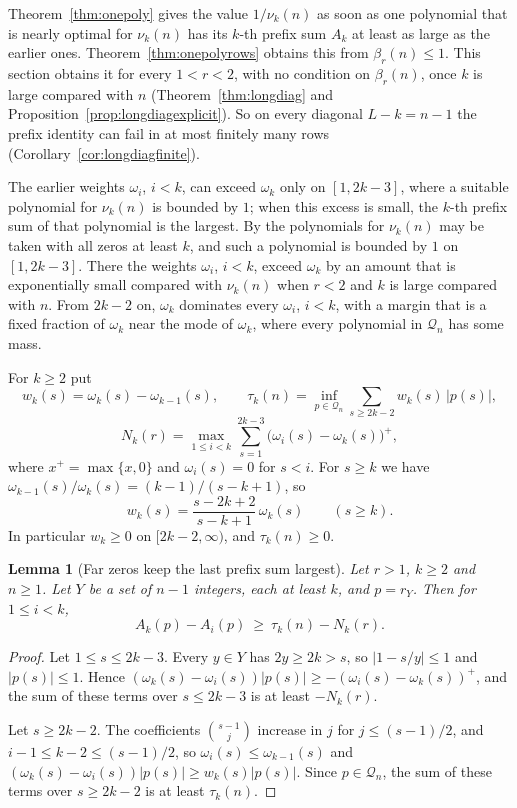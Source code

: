 \documentclass[11pt]{article}
\newtheorem{lemma}[theorem]{Lemma}
\begin{document}
Theorem~\ref{thm:onepoly} gives the value $1/\nu_k(n)$ as soon
as one polynomial that is nearly optimal for $\nu_k(n)$ has its $k$-th
prefix sum $A_k$ at least as large as the earlier ones.
Theorem~\ref{thm:onepolyrows} obtains this from $\beta_r(n)\le1$.  This
section obtains it for every $1<r<2$, with no condition on $\beta_r(n)$,
once $k$ is large compared with $n$ (Theorem~\ref{thm:longdiag} and
Proposition~\ref{prop:longdiagexplicit}).  So on every diagonal
$L-k=n-1$ the prefix identity can fail in at most finitely many rows
(Corollary~\ref{cor:longdiagfinite}).

The earlier weights $\omega_i$, $i<k$, can exceed $\omega_k$ only on
$[1,2k-3]$, where a suitable polynomial for $\nu_k(n)$ is bounded by $1$;
when this excess is small, the $k$-th prefix sum of that polynomial is the
largest.  By
\cite[Lemma~3.1]{coefficient-mass-rows} the polynomials for
$\nu_k(n)$ may be taken with all zeros at least $k$, and such a polynomial is
bounded by $1$ on $[1,2k-3]$.  There the weights $\omega_i$, $i<k$, exceed
$\omega_k$ by an amount that is exponentially small compared with $\nu_k(n)$
when $r<2$ and $k$ is large compared with $n$.  From $2k-2$ on, $\omega_k$ dominates every $\omega_i$, $i<k$,
with a margin that is a fixed fraction of $\omega_k$ near the mode of
$\omega_k$, where every polynomial in $\mathcal Q_n$ has some mass.

For $k\ge2$ put
\[
  w_k(s)=\omega_k(s)-\omega_{k-1}(s),\qquad
  \tau_k(n)=\inf_{p\in\mathcal Q_n}\sum_{s\ge2k-2}w_k(s)\,|p(s)|,
\]
\[
  N_k(r)=\max_{1\le i<k}\sum_{s=1}^{2k-3}\bigl(\omega_i(s)-\omega_k(s)\bigr)^+,
\]
where $x^+=\max\{x,0\}$ and $\omega_i(s)=0$ for $s<i$.  For $s\ge k$ we have
$\omega_{k-1}(s)/\omega_k(s)=(k-1)/(s-k+1)$, so
\begin{equation}\label{eq:wkratio}
  w_k(s)=\frac{s-2k+2}{s-k+1}\,\omega_k(s)\qquad(s\ge k).
\end{equation}
In particular $w_k\ge0$ on $[2k-2,\infty)$, and $\tau_k(n)\ge0$.

\begin{lemma}[Far zeros keep the last prefix sum largest]\label{lem:farprefix}
Let $r>1$, $k\ge2$ and $n\ge1$.  Let $Y$ be a set of $n-1$ integers, each at
least $k$, and $p=r_Y$.  Then for $1\le i<k$,
\[
  A_k(p)-A_i(p)\ \ge\ \tau_k(n)-N_k(r).
\]
\end{lemma}

\begin{proof}
Let $1\le s\le2k-3$.  Every $y\in Y$ has $2y\ge2k>s$, so $|1-s/y|\le1$ and
$|p(s)|\le1$.  Hence
$(\omega_k(s)-\omega_i(s))|p(s)|\ge-(\omega_i(s)-\omega_k(s))^+$, and the
sum of these terms over $s\le2k-3$ is at least $-N_k(r)$.

Let $s\ge2k-2$.  The coefficients $\binom{s-1}j$ increase in $j$ for
$j\le(s-1)/2$, and $i-1\le k-2\le(s-1)/2$, so $\omega_i(s)\le\omega_{k-1}(s)$
and $(\omega_k(s)-\omega_i(s))|p(s)|\ge w_k(s)|p(s)|$.  Since $p\in\mathcal Q_n$,
the sum of these terms over $s\ge2k-2$ is at least $\tau_k(n)$.
\end{proof}
\end{document}
